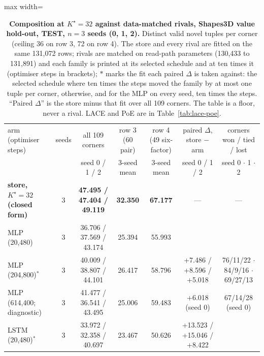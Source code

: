 \documentclass{article} %
\newcommand{\Kstar}{\ensuremath{K^{\star}}}
\begin{document}
\begin{table}[t]
\centering\small
\caption{\textbf{Composition at $\Kstar=32$ against data-matched rivals, Shapes3D value hold-out, TEST, $n=3$
seeds (0, 1, 2).} Distinct valid novel tuples per corner (ceiling 36 on row 3, 72 on row 4). The store %
and every rival are fitted on the same 131,072 rows; rivals are matched on read-path parameters %
(130,433 to 131,891) and each family is printed at its selected schedule and at ten times it %
(optimiser steps in brackets); $\ast$ marks the fit each paired $\Delta$ is taken against: the
selected schedule where ten times the steps moved the family by at most one tuple per corner,
otherwise, and for the MLP on every seed, ten times the steps. ``Paired $\Delta$'' is the store minus
that fit over all 109 corners. The table is a floor, never a rival. LACE and PoE are in
Table~\ref{tab:lace-poe}.}
\label{tab:t7}
\setlength{\tabcolsep}{3pt}
\begin{adjustbox}{max width=\linewidth}\begin{tabular}{lcccccc}
\toprule
arm (optimiser steps) & seeds & all 109 corners & row 3 (60 pair) & row 4 (49 six-factor) & paired $\Delta$, store $-$ arm & corners won / tied / lost \\
 & & seed 0 / 1 / 2 & 3-seed mean & 3-seed mean & seed 0 / 1 / 2 & seed 0 $\cdot$ 1 $\cdot$ 2 \\
\midrule
\textbf{store, $\Kstar=32$ (closed form)} & 3 & \textbf{47.495 / 47.404 / 49.119} & \textbf{32.350} & \textbf{67.177} & --- & --- \\
MLP (20,480) & 3 & 36.706 / 37.569 / 43.174 & 25.394 & 55.993 & & \\
MLP (204,800)$^\ast$ & 3 & 40.009 / 38.807 / 44.101 & 26.417 & 58.796 & +7.486 / +8.596 / +5.018 & 76/11/22 $\cdot$ 84/9/16 $\cdot$ 69/27/13 \\
MLP (614,400; diagnostic) & 3 & 41.477 / 36.541 / 43.495 & 25.006 & 59.483 & +6.018 (seed 0) & 67/14/28 (seed 0) \\
LSTM (20,480)$^\ast$ & 3 & 33.972 / 32.358 / 40.697 & 23.467 & 50.626 & +13.523 / +15.046 / +8.422 & \\

\end{tabular}
\end{adjustbox}
\end{table}
\end{document}
